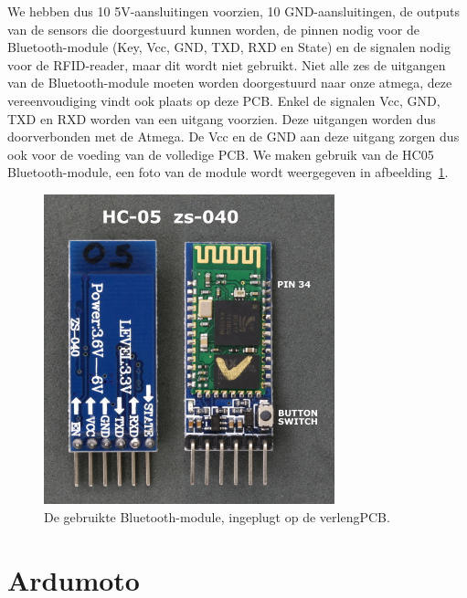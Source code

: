 We hebben dus 10 5V-aansluitingen voorzien, 10 GND-aansluitingen, de outputs van de sensors die doorgestuurd kunnen worden, de pinnen nodig voor de Bluetooth-module (Key, Vcc, GND, TXD, RXD en State) en de signalen nodig voor de RFID-reader, maar dit wordt niet gebruikt. Niet alle zes de uitgangen van de Bluetooth-module moeten worden doorgestuurd naar onze atmega, deze vereenvoudiging vindt ook plaats op deze PCB. Enkel de signalen Vcc, GND, TXD en RXD worden van een uitgang voorzien. Deze uitgangen worden dus doorverbonden met de Atmega. De Vcc en de GND aan deze uitgang zorgen dus ook voor de voeding van de volledige PCB. We maken gebruik van de HC05 Bluetooth-module, een foto van de module wordt weergegeven in afbeelding~\ref{fig:HC05}.
\begin{figure}[h]
\centering
\includegraphics[width=0.75\textwidth]{HC05.jpg}
\caption{De gebruikte Bluetooth-module, ingeplugt op de verlengPCB.}
\label{fig:HC05}
\end{figure}
\section{Ardumoto}
